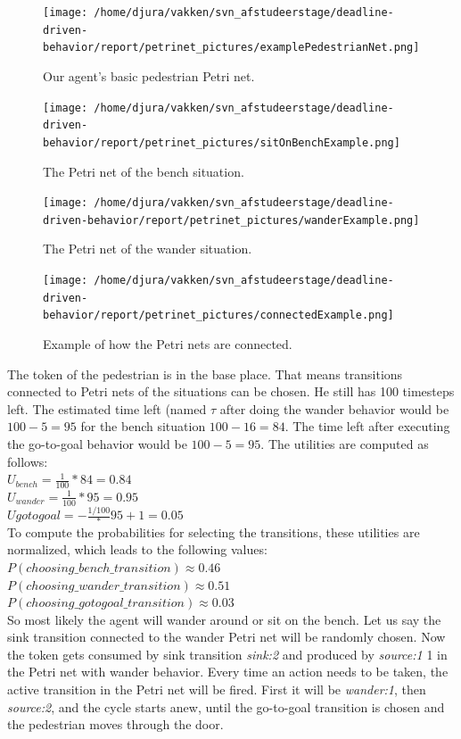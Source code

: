 \documentclass[11pt, a4paper]{book}
\begin{document}
\begin{figure}[h!]
\centering            
\texttt{[image: /home/djura/vakken/svn\_afstudeerstage/deadline-driven-behavior/report/petrinet\_pictures/examplePedestrianNet.png]}
\caption{Our agent's basic pedestrian Petri net.}
\label{fig:exampleAgentnet}
\end{figure} 
\begin{figure}[h!]
\centering            
\texttt{[image: /home/djura/vakken/svn\_afstudeerstage/deadline-driven-behavior/report/petrinet\_pictures/sitOnBenchExample.png]}
\caption{The Petri net of the bench situation.}
\label{fig:benchSituationNet}
\end{figure} 

\begin{figure}[h!]
\centering            
\texttt{[image: /home/djura/vakken/svn\_afstudeerstage/deadline-driven-behavior/report/petrinet\_pictures/wanderExample.png]}
\caption{The Petri net of the wander situation.}
\label{fig:wanderSituationNet}
\end{figure}

\begin{figure}[h!]
\centering            
\texttt{[image: /home/djura/vakken/svn\_afstudeerstage/deadline-driven-behavior/report/petrinet\_pictures/connectedExample.png]}
\caption{Example of how the Petri nets are connected.}
\label{fig:connectedExample}
\end{figure}

The token of the pedestrian is in the base place. That means transitions connected to Petri nets of the situations can be chosen. He still has 100 timesteps left. The estimated time left (named $\tau$ after doing the wander behavior would be $100 - 5=95$ for the bench situation $100-16=84$. The time left after executing the go-to-goal behavior would be $100-5=95$. The utilities are computed as follows:\\
$U_{bench}=\frac{1}{100} * 84 = 0.84$  \\
$U_{wander}=\frac{1}{100} * 95=0.95 $\\
$U{gotogoal}=-\frac{1/100} * 95 + 1 =0.05$\\

To compute the probabilities for selecting the transitions, these utilities are normalized, which leads to the following values:\\
$P(choosing\_bench\_transition)\approx 0.46$\\
$P(choosing\_wander\_transition)\approx 0.51$\\
$P(choosing\_gotogoal\_transition)\approx 0.03$\\
So most likely the agent will wander around or sit on the bench. Let us say the sink transition connected to the wander Petri net will be randomly chosen. Now the token gets consumed by sink transition \emph{sink:2} and produced by \emph{source:1} 1 in the Petri net with wander behavior. Every time an action needs to be taken, the active transition in the Petri net will be fired. First it will be \emph{wander:1}, then \emph{source:2}, and the cycle starts anew, until the go-to-goal transition is chosen and the pedestrian moves through the door.
\end{document}

